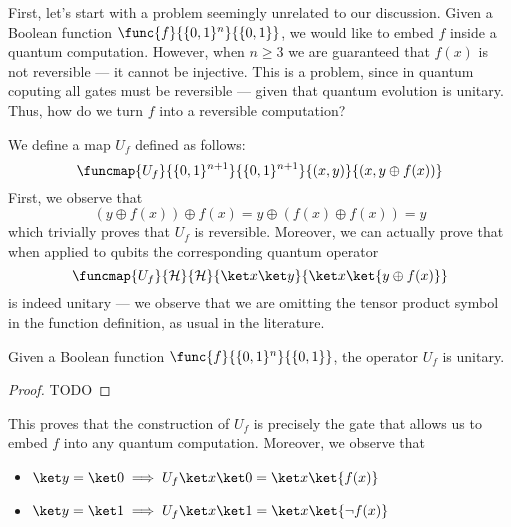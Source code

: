 \documentclass[a4paper, 12pt]{report}
\begin{document}
First, let's start with a problem seemingly unrelated to our discussion. Given a Boolean function $\func{f}{\{0, 1\}^n}{\{0, 1\}}$, we would like to embed $f$ inside a quantum computation. However, when $n \ge 3$ we are guaranteed that $f(x)$ is not reversible --- it cannot be injective. This is a problem, since in quantum coputing all gates must be reversible --- given that quantum evolution is unitary. Thus, how do we turn $f$ into a reversible computation?

We define a map $U_f$ defined as follows: $$\funcmap{U_f}{\{0, 1\}^{n + 1}}{\{0, 1\}^{n + 1}}{(x, y)}{(x, y \oplus f(x))}$$ First, we observe that $$(y \oplus f(x)) \oplus f(x) = y \oplus (f(x) \oplus f(x)) = y$$ which trivially proves that $U_f$ is reversible. Moreover, we can actually prove that when applied to qubits the corresponding quantum operator $$\funcmap{U_f}{\mathcal H}{\mathcal H}{\ket x \ket y}{\ket x \ket{y \oplus f(x)}}$$ is indeed unitary --- we observe that we are omitting the tensor product symbol in the function definition, as usual in the literature.

\begin{framedprop}{}
    Given a Boolean function $\func{f}{\{0, 1\}^n}{\{0, 1\}}$, the operator $U_f$ is unitary.
\end{framedprop}

\begin{proof}
    TODO 
\end{proof}

This proves that the construction of $U_f$ is precisely the gate that allows us to embed $f$ into any quantum computation. Moreover, we observe that

\begin{itemize}
    \item $\ket y = \ket 0 \implies U_f \ket x \ket 0 = \ket x \ket{f(x)}$
    \item $\ket y = \ket 1 \implies U_f \ket x \ket 1 = \ket x \ket{\lnot f(x)}$
\end{itemize}
\end{document}
